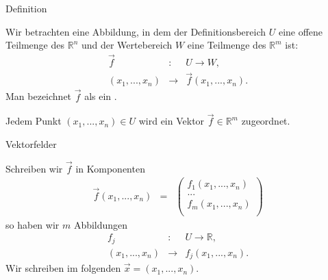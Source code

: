 \documentclass[german]{beamer}
\newcommand{\bq}{\begin{eqnarray*}}
\newcommand{\eq}{\end{eqnarray*}}
\newcommand{\superalert}[1]{{\color{MyYellowOrange}{#1}}}
\begin{document}
\begin{frame}{Definition}

\begin{definition}
Wir betrachten eine Abbildung, in dem der Definitionsbereich $U$ eine
offene Teilmenge des ${\mathbb R}^n$ und der Wertebereich $W$ eine Teilmenge des ${\mathbb R}^m$ ist:
\bq
 \vec{f} & : & U \rightarrow W,
 \nonumber \\
 \left( x_1, ..., x_n \right) & \rightarrow & \vec{f}\left( x_1, ..., x_n \right).
\eq
Man bezeichnet $\vec{f}$ als ein \superalert{Vektorfeld}.

Jedem Punkt $( x_1, ..., x_n) \in U$ wird ein Vektor $\vec{f} \in {\mathbb R}^m$ zugeordnet.
\end{definition}

\end{frame}

\begin{frame}{Vektorfelder}

Schreiben wir $\vec{f}$ in Komponenten
\bq
 \vec{f}\left( x_1, ..., x_n \right) & = & 
 \left( \begin{array}{c}
 f_1\left( x_1, ..., x_n \right) \\
 ... \\
 f_m\left( x_1, ..., x_n \right) \\
 \end{array} \right)
\eq
so haben wir $m$ Abbildungen
\bq
 f_j & : & U \rightarrow {\mathbb R},
 \nonumber \\
 \left( x_1, ..., x_n \right) & \rightarrow & f_j\left( x_1, ..., x_n \right).
\eq
Wir schreiben im folgenden $\vec{x}=( x_1, ..., x_n )$.

\end{frame}
\end{document}
